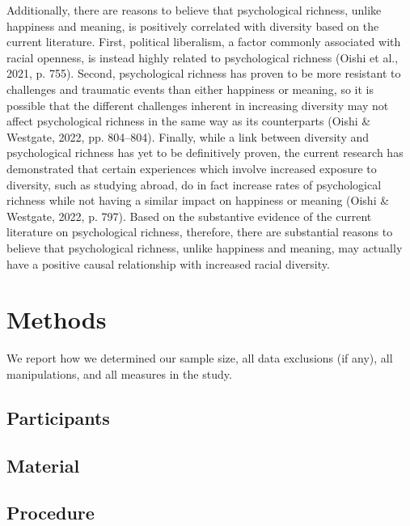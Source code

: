 \documentclass[
  man,floatsintext]{apa7}
\begin{document}
Additionally, there are reasons to believe that psychological richness, unlike happiness and meaning, is positively correlated with diversity based on the current literature. First, political liberalism, a factor commonly associated with racial openness, is instead highly related to psychological richness (Oishi et al., 2021, p. 755). Second, psychological richness has proven to be more resistant to challenges and traumatic events than either happiness or meaning, so it is possible that the different challenges inherent in increasing diversity may not affect psychological richness in the same way as its counterparts (Oishi \& Westgate, 2022, pp. 804--804). Finally, while a link between diversity and psychological richness has yet to be definitively proven, the current research has demonstrated that certain experiences which involve increased exposure to diversity, such as studying abroad, do in fact increase rates of psychological richness while not having a similar impact on happiness or meaning (Oishi \& Westgate, 2022, p. 797). Based on the substantive evidence of the current literature on psychological richness, therefore, there are substantial reasons to believe that psychological richness, unlike happiness and meaning, may actually have a positive causal relationship with increased racial diversity.

\hypertarget{methods}{%
\section{Methods}\label{methods}}

We report how we determined our sample size, all data exclusions (if any), all manipulations, and all measures in the study.

\hypertarget{participants}{%
\subsection{Participants}\label{participants}}

\hypertarget{material}{%
\subsection{Material}\label{material}}

\hypertarget{procedure}{%
\subsection{Procedure}\label{procedure}}
\end{document}
